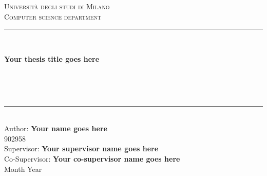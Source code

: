 \documentclass[\main/main.tex]{subfiles}
\begin{document}
\pagestyle{empty} %
\begin{titlepage}
	\begin{center}
		\vfill
		{\large \scshape Università degli studi di Milano}\\[0.1cm]
		{\large \scshape Computer science department}\\[0.5cm]
		\rule{\textwidth}{1.5pt}\\[0cm]
		{\huge \bfseries  Your thesis title goes here \par \ }\\[-0.5cm]
		\rule{\textwidth}{1.5pt}\\[2.5cm]
		{\hfill \large Author: \textbf{Your name goes here}} \\
		\vspace{0.1cm}
		{\hfill \large 902958} \\
		\vspace{0.5cm}
		{\hfill \large Supervisor: \textbf{Your supervisor name goes here}} \\
	    {\hfill \large Co-Supervisor: \textbf{Your co-supervisor name goes here} \\}
	    \vspace{1cm}
		\hfill  Month Year
	\end{center}
\end{titlepage}
\end{document}
